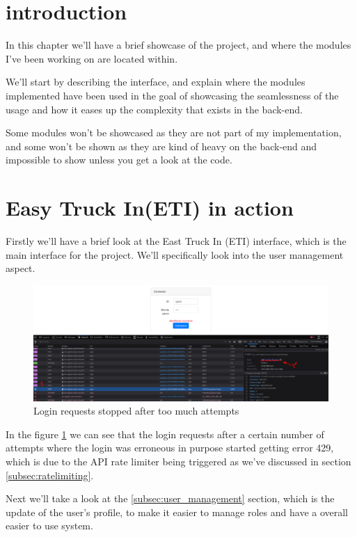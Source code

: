 \section{introduction}

In this chapter we'll have a brief showcase of the project, and where the modules
I've been working on are located within.

We'll start by describing the interface, and explain where the modules implemented
have been used in the goal of showcasing the seamlessness of the usage and 
how it eases up the complexity that exists in the back-end.

Some modules won't be showcased as they are not part of my implementation, and 
some won't be shown as they are kind of heavy on the back-end and impossible to
show unless you get a look at the code.

\section{Easy Truck In(ETI) in action}

Firstly we'll have a brief look at the East Truck In (ETI) interface, which is 
the main interface for the project. We'll specifically look into the user management
aspect.

\begin{figure}[!ht]
    \centering
    \includegraphics[width=\textwidth]{images/login too much attempts}
    \caption{\footnotesize{Login requests stopped after too much attempts}}
    \label{fig:login_req_ratelimit}
\end{figure}

In the figure \ref{fig:login_req_ratelimit} we can see that the login requests after a
certain number of attempts where the login was erroneous in purpose started getting
error 429, which is due to  the API rate limiter being triggered as we've discussed in
section \ref{subsec:ratelimiting}.

Next we'll take a look at the \ref{subsec:user_management} section, which is the
update of the user's profile, to make it easier to manage roles and have a overall easier
to use system.


